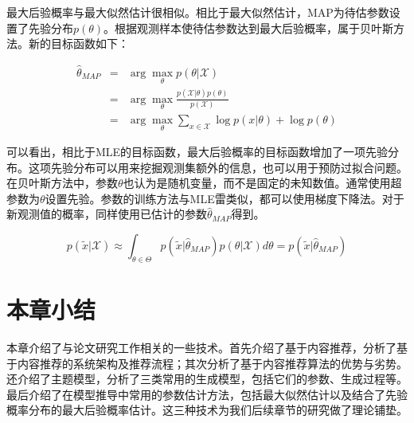 最大后验概率与最大似然估计很相似。相比于最大似然估计，MAP为待估参数设置了先验分布$p(\theta)$。根据观测样本使待估参数达到最大后验概率，属于贝叶斯方法。新的目标函数如下：

\begin{eqnarray}
	\hat{\theta}_{MAP} &=& \arg\max_\theta p(\theta|\mathcal{X}) \nonumber \\
	&=& \arg\max_\theta \frac{p(\mathcal{X}|\theta)p(\theta)}{p(\mathcal{X})} \nonumber \\
	&=& \arg\max_\theta {\sum_{x \in \mathcal{X}}\log p(x|\theta) + \log p(\theta)}
\end{eqnarray}

可以看出，相比于MLE的目标函数，最大后验概率的目标函数增加了一项先验分布。这项先验分布可以用来挖掘观测集额外的信息，也可以用于预防过拟合问题。在贝叶斯方法中，参数$\theta$也认为是随机变量，而不是固定的未知数值。通常使用超参数为$\theta$设置先验。参数的训练方法与MLE雷类似，都可以使用梯度下降法。对于新观测值的概率，同样使用已估计的参数$\hat{\theta}_{MAP}$得到。

\begin{equation}
p(\tilde{x}|\mathcal{X}) \approx \int_{\theta \in \Theta}p(\tilde{x}|\hat{\theta}_{MAP})p(\theta|\mathcal{X})d\theta = p(\tilde{x}|\hat{\theta}_{MAP})
\end{equation}

\section{本章小结}
本章介绍了与论文研究工作相关的一些技术。首先介绍了基于内容推荐，分析了基于内容推荐的系统架构及推荐流程；其次分析了基于内容推荐算法的优势与劣势。还介绍了主题模型，分析了三类常用的生成模型，包括它们的参数、生成过程等。最后介绍了在模型推导中常用的参数估计方法，包括最大似然估计以及结合了先验概率分布的最大后验概率估计。这三种技术为我们后续章节的研究做了理论铺垫。









